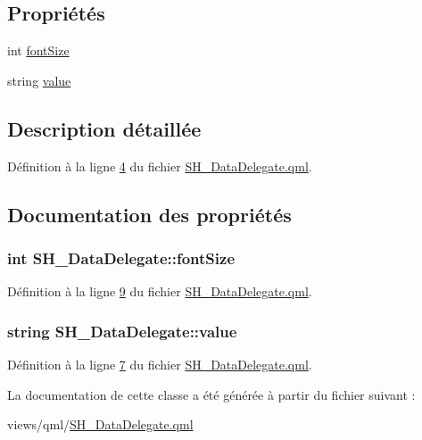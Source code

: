 \subsection*{Propriétés}
\begin{DoxyCompactItemize}
\item 
int \hyperlink{classSH__DataDelegate_afbb41ad9b513c7f27e7b5ad90d82e95b}{font\-Size}
\item 
string \hyperlink{classSH__DataDelegate_acb9da3c73493c88865e08d9575f26482}{value}
\end{DoxyCompactItemize}


\subsection{Description détaillée}


Définition à la ligne \hyperlink{SH__DataDelegate_8qml_source_l00004}{4} du fichier \hyperlink{SH__DataDelegate_8qml_source}{S\-H\-\_\-\-Data\-Delegate.\-qml}.



\subsection{Documentation des propriétés}
\hypertarget{classSH__DataDelegate_afbb41ad9b513c7f27e7b5ad90d82e95b}{
\subsubsection[{font\-Size}]{\setlength{\rightskip}{0pt plus 5cm}int S\-H\-\_\-\-Data\-Delegate\-::font\-Size}}\label{classSH__DataDelegate_afbb41ad9b513c7f27e7b5ad90d82e95b}


Définition à la ligne \hyperlink{SH__DataDelegate_8qml_source_l00009}{9} du fichier \hyperlink{SH__DataDelegate_8qml_source}{S\-H\-\_\-\-Data\-Delegate.\-qml}.

\hypertarget{classSH__DataDelegate_acb9da3c73493c88865e08d9575f26482}{
\subsubsection[{value}]{\setlength{\rightskip}{0pt plus 5cm}string S\-H\-\_\-\-Data\-Delegate\-::value}}\label{classSH__DataDelegate_acb9da3c73493c88865e08d9575f26482}


Définition à la ligne \hyperlink{SH__DataDelegate_8qml_source_l00007}{7} du fichier \hyperlink{SH__DataDelegate_8qml_source}{S\-H\-\_\-\-Data\-Delegate.\-qml}.



La documentation de cette classe a été générée à partir du fichier suivant \-:\begin{DoxyCompactItemize}
\item 
views/qml/\hyperlink{SH__DataDelegate_8qml}{S\-H\-\_\-\-Data\-Delegate.\-qml}\end{DoxyCompactItemize}
